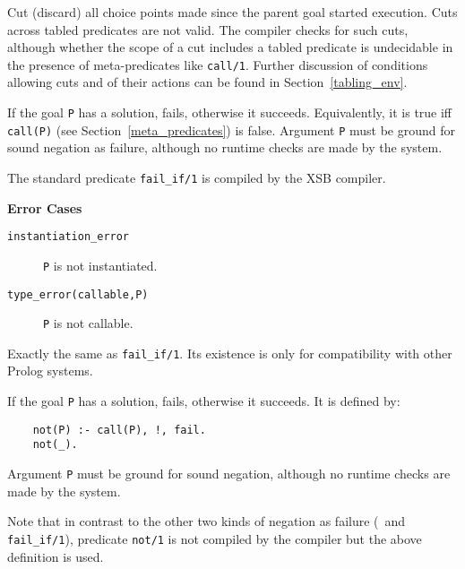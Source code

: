 \begin{description}
\ouritem{\cut}   
    Cut (discard) all choice points made since the parent goal
    started execution.
    Cuts across tabled predicates are not valid.  The compiler checks for
    such cuts, although whether the scope of a cut includes a tabled 
    predicate is undecidable in the presence of meta-predicates like
    {\tt call/1}.
    Further discussion of conditions allowing cuts and of their actions 
    can be found in Section~\ref{tabling_env}.

    If the goal {\tt P} has a solution, fails, otherwise it succeeds.
    Equivalently, it is true iff {\tt call(P)} 
    (see Section~\ref{meta_predicates}) is false. Argument {\tt P} 
    must be ground for sound negation as failure, although no runtime 
    checks are made by the system.

    The standard predicate {\tt fail\_if/1} is compiled by the 
    XSB compiler.

{\bf Error Cases}
    \begin{description}
    \item[{\tt instantiation\_error}]
	{\tt P} is not instantiated.
    \item[{\tt type\_error(callable,P)}]
	{\tt P} is not callable.
    \end{description}


    Exactly the same as {\tt fail\_if/1}.  Its existence is only 
    for compatibility with other Prolog systems.

    If the goal {\tt P} has a solution, fails, otherwise it succeeds.
    It is defined by:
    \begin{center}
    \begin{minipage}{2.40in}
    \begin{verbatim}
	not(P) :- call(P), !, fail.
	not(_).
    \end{verbatim}
    \end{minipage}
    \end{center}

    Argument {\tt P} must be ground for sound negation, although no 
    runtime checks are made by the system.

    Note that in contrast to the other two kinds of negation as failure
    (\not\ and {\tt fail\_if/1}), predicate {\tt not/1} is not compiled
    by the compiler but the above definition is used.


\end{description}
